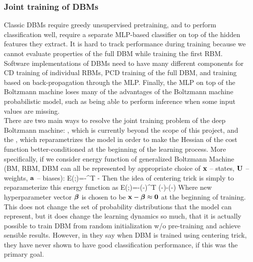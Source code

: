 \subsubsection{Joint training of DBMs}
Classic DBMs require greedy unsupervised pretraining, and to perform classification
well, require a separate MLP-based classifier on top of the hidden features they
extract. It is hard to track performance
during training because we cannot evaluate properties of the full DBM while
training the first RBM. Software implementations
of DBMs need to have many different components for CD training of individual
RBMs, PCD training of the full DBM, and training based on back-propagation
through the MLP. Finally, the MLP on top of the Boltzmann machine loses many
of the advantages of the Boltzmann machine probabilistic model, such as being
able to perform inference when some input values are missing.
\\
There are two main ways to resolve the joint training problem of the deep
Boltzmann machine: \cite{goodfellow2013multi}, which is currently beyond the scope of this project, and the  \cite{montavon2012deep}, which reparametrizes the model in order to make the Hessian of the cost function better-conditioned at the beginning of the learning process. More specifically, if we consider energy function of generalized Boltzmann Machine (BM, RBM, DBM can all be represented by appropriate choice of $\mathbf{x}$ -- states, $\mathbf{U}$ -- weights, $\mathbf{a}$ -- biases):
\bg
E(;\bs{\psi})=-^T -\cdot{}
\eg
Then the idea of centering trick is simply to reparameterize this energy function as 
\bg
E(;\bs{\psi})=-(-\bs{\beta})^T (-\bs{\beta})-\cdot(-\bs{\beta})
\eg
Where new hyperparameter vector $\boldsymbol{\beta}$ is chosen to be $\mathbf{x}-\boldsymbol{\beta}\approx \mathbf{0}$ at the beginning of training. This does not change the set of probability distributions that the model can represent, but it does change the learning dynamics so much, that it is actually possible to train DBM from random initialization w/o pre-training and achieve sensible results. However, in \cite{goodfellow2013multi} they say when DBM is trained using centering trick, they have never shown to have good classification performance, if this was the primary goal.

